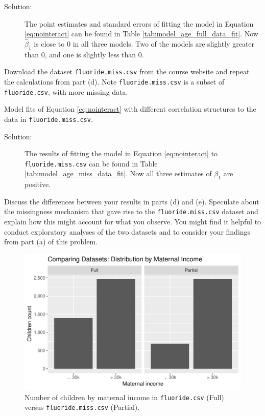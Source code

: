 \documentclass[11pt, letterpaper]{article}
\begin{document}
\begin{enumerate}[(a)]
\begin{description}
\item[Solution:] The point estimates and standard errors of fitting the model in
  Equation \ref{eq:nointeract} can be found in Table
  \ref{tab:model_age_full_data_fit}. Now $\hat{\beta}_1$ is close to $0$ in all
  three models. Two of the models are slightly greater than $0$, and one is
  slightly less than $0$.
\end{description}
{\em \item Download the dataset \texttt{fluoride.miss.csv} from the course website and repeat the calculations from part (d).  Note \texttt{fluoride.miss.csv} is a subset of \texttt{fluoride.csv}, with more missing data.}
\begin{table}[ht]
  \scriptsize
  \centering
  
  \caption{Model fits of Equation \ref{eq:nointeract} with different correlation
    structures to the data in \texttt{fluoride.miss.csv}.}
  \label{tab:model_age_miss_data_fit}
\end{table}
\begin{description}
\item[Solution:] The results of fitting the model in Equation
  \ref{eq:nointeract} to \texttt{fluoride.miss.csv} can be found in Table
  \ref{tab:model_age_miss_data_fit}. Now all three estimates of $\beta_1$ are
  positive.
\end{description}
{\em \item  Discuss the differences between your results in parts (d) and (e).  Speculate
about the missingness mechanism that gave rise to the \texttt{fluoride.miss.csv} dataset and 
explain how this might account for what you observe.  You might find it
helpful to conduct exploratory analyses of the two datasets and to consider your findings from part (a) of this problem.}

\begin{figure}[ht]
  \centering
  \includegraphics{dataset_comparison.pdf}
  \caption{Number of children by maternal income in \texttt{fluoride.csv} (Full)
    versus \texttt{fluoride.miss.csv} (Partial).}
  \label{fig:dataset_comparison}
\end{figure}


\end{enumerate}
\end{document}
